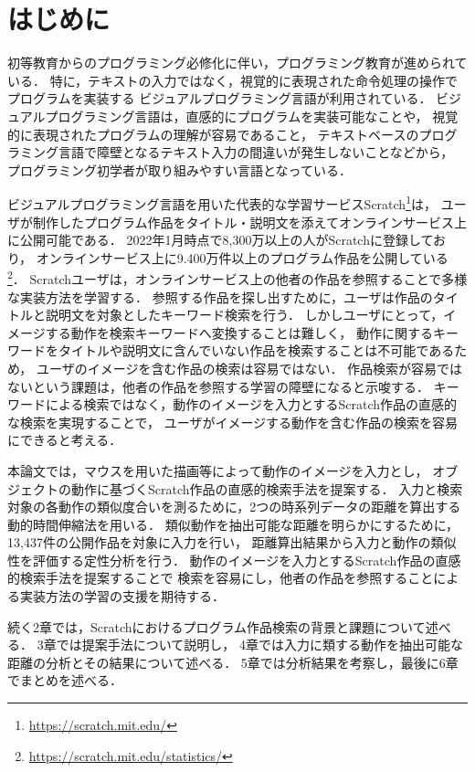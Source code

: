 \documentclass[11pt]{jreport}
\begin{document}
\chapter{はじめに}

初等教育からのプログラミング必修化に伴い，プログラミング教育が進められている．
特に，テキストの入力ではなく，視覚的に表現された命令処理の操作でプログラムを実装する
ビジュアルプログラミング言語が利用されている．
ビジュアルプログラミング言語は，直感的にプログラムを実装可能なことや，
視覚的に表現されたプログラムの理解が容易であること，
テキストベースのプログラミング言語で障壁となるテキスト入力の間違いが発生しないことなどから，
プログラミング初学者が取り組みやすい言語となっている．

ビジュアルプログラミング言語を用いた代表的な学習サービスScratch\footnote{ \url{https://scratch.mit.edu/}}は，
ユーザが制作したプログラム作品をタイトル・説明文を添えてオンラインサービス上に公開可能である．
2022年1月時点で8,300万以上の人がScratchに登録しており，
オンラインサービス上に9.400万件以上のプログラム作品を公開している
\footnote{\url{https://scratch.mit.edu/statistics/}}．
Scratchユーザは，オンラインサービス上の他者の作品を参照することで多様な実装方法を学習する\cite{spfa}．
参照する作品を探し出すために，ユーザは作品のタイトルと説明文を対象としたキーワード検索を行う．
しかしユーザにとって，イメージする動作を検索キーワードへ変換することは難しく，
動作に関するキーワードをタイトルや説明文に含んでいない作品を検索することは不可能であるため，
ユーザのイメージを含む作品の検索は容易ではない．
作品検索が容易ではないという課題は，他者の作品を参照する学習の障壁になると示唆する．
キーワードによる検索ではなく，動作のイメージを入力とするScratch作品の直感的な検索を実現することで，
ユーザがイメージする動作を含む作品の検索を容易にできると考える．

本論文では，マウスを用いた描画等によって動作のイメージを入力とし，
オブジェクトの動作に基づくScratch作品の直感的検索手法を提案する．
入力と検索対象の各動作の類似度合いを測るために，2つの時系列データの距離を算出する動的時間伸縮法を用いる．
類似動作を抽出可能な距離を明らかにするために，13,437件の公開作品を対象に入力を行い，
距離算出結果から入力と動作の類似性を評価する定性分析を行う．
動作のイメージを入力とするScratch作品の直感的検索手法を提案することで
検索を容易にし，他者の作品を参照することによる実装方法の学習の支援を期待する．

続く2章では，Scratchにおけるプログラム作品検索の背景と課題について述べる．
3章では提案手法について説明し，
4章では入力に類する動作を抽出可能な距離の分析とその結果について述べる．
5章では分析結果を考察し，最後に6章でまとめを述べる．
\end{document}
